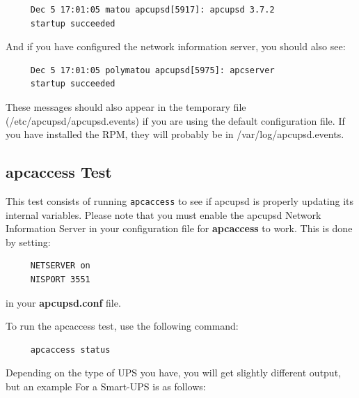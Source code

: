 \footnotesize
\begin{verbatim}
     Dec 5 17:01:05 matou apcupsd[5917]: apcupsd 3.7.2
     startup succeeded
\end{verbatim}
\normalsize

And if you have configured the network information server, you should also
see: 

\footnotesize
\begin{verbatim}
     Dec 5 17:01:05 polymatou apcupsd[5975]: apcserver
     startup succeeded
\end{verbatim}
\normalsize

These messages should also appear in the temporary file
(/etc/apcupsd/apcupsd.events) if you are using the default configuration file.
If you have installed the RPM, they will probably be in
/var/log/apcupsd.events. 

\label{apcaccess-Test}

\subsection*{apcaccess Test}

\label{index-Testing_002c-apcaccess-89}
\label{index-apcaccess-Test-90}
This test consists of running {\tt apcaccess} to see if apcupsd is properly
updating its internal variables.  Please note that you must enable the 
apcupsd Network Information Server in your configuration file for 
{\bf apcaccess} to work.  This is done by setting: 

\footnotesize
\begin{verbatim}
     NETSERVER on
     NISPORT 3551
\end{verbatim}
\normalsize

in your {\bf apcupsd.conf} file.  

To run the apcaccess test, use the following command: 

\footnotesize
\begin{verbatim}
     apcaccess status
\end{verbatim}
\normalsize

Depending on the type of UPS you have, you will get slightly different output,
but an example For a Smart-UPS is as follows: 

